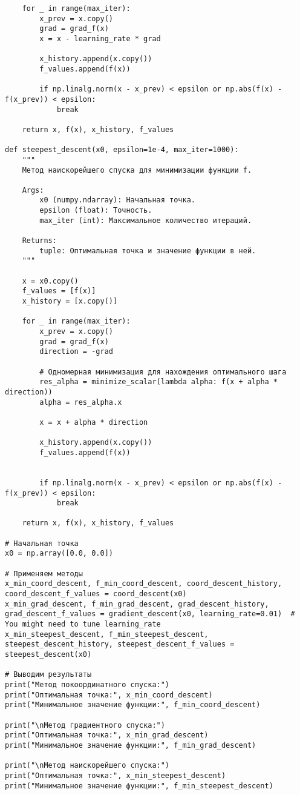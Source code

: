 \documentclass{article}
\begin{document}
\begin{lstlisting}
    for _ in range(max_iter):
        x_prev = x.copy()
        grad = grad_f(x)
        x = x - learning_rate * grad

        x_history.append(x.copy())
        f_values.append(f(x))

        if np.linalg.norm(x - x_prev) < epsilon or np.abs(f(x) - f(x_prev)) < epsilon:
            break

    return x, f(x), x_history, f_values

def steepest_descent(x0, epsilon=1e-4, max_iter=1000):
    """
    Метод наискорейшего спуска для минимизации функции f.

    Args:
        x0 (numpy.ndarray): Начальная точка.
        epsilon (float): Точность.
        max_iter (int): Максимальное количество итераций.

    Returns:
        tuple: Оптимальная точка и значение функции в ней.
    """

    x = x0.copy()
    f_values = [f(x)]
    x_history = [x.copy()]

    for _ in range(max_iter):
        x_prev = x.copy()
        grad = grad_f(x)
        direction = -grad

        # Одномерная минимизация для нахождения оптимального шага
        res_alpha = minimize_scalar(lambda alpha: f(x + alpha * direction))
        alpha = res_alpha.x

        x = x + alpha * direction

        x_history.append(x.copy())
        f_values.append(f(x))


        if np.linalg.norm(x - x_prev) < epsilon or np.abs(f(x) - f(x_prev)) < epsilon:
            break

    return x, f(x), x_history, f_values

# Начальная точка
x0 = np.array([0.0, 0.0])

# Применяем методы
x_min_coord_descent, f_min_coord_descent, coord_descent_history, coord_descent_f_values = coord_descent(x0)
x_min_grad_descent, f_min_grad_descent, grad_descent_history, grad_descent_f_values = gradient_descent(x0, learning_rate=0.01)  # You might need to tune learning_rate
x_min_steepest_descent, f_min_steepest_descent, steepest_descent_history, steepest_descent_f_values = steepest_descent(x0)

# Выводим результаты
print("Метод покоординатного спуска:")
print("Оптимальная точка:", x_min_coord_descent)
print("Минимальное значение функции:", f_min_coord_descent)

print("\nМетод градиентного спуска:")
print("Оптимальная точка:", x_min_grad_descent)
print("Минимальное значение функции:", f_min_grad_descent)

print("\nМетод наискорейшего спуска:")
print("Оптимальная точка:", x_min_steepest_descent)
print("Минимальное значение функции:", f_min_steepest_descent)
\end{lstlisting}
\end{document}
